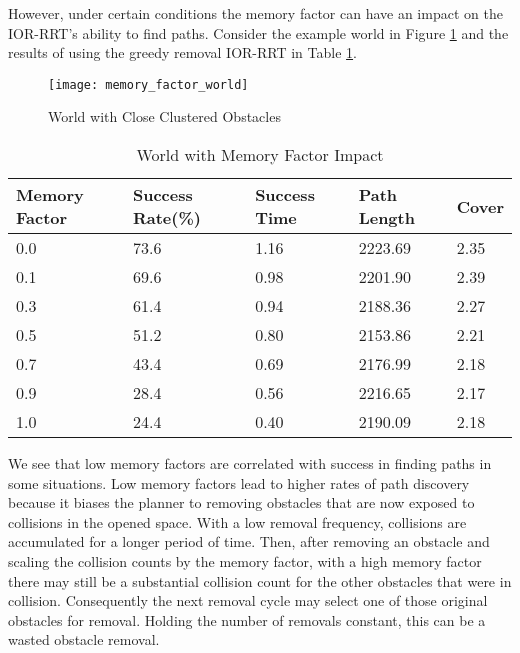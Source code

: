 However, under certain conditions the memory factor can have an impact on the IOR-RRT's ability to find paths. Consider the example world in Figure \ref{fig:memory_factor_world} and the results of using the greedy removal IOR-RRT in Table \ref{tab:memory_factor_impact}.


\begin{figure}[h!]
    \centering
    \texttt{[image: memory\_factor\_world]}
    \caption{World with Close Clustered Obstacles}
    \label{fig:memory_factor_world}
\end{figure}

\begin{table}[h!]
\centering
\begin{tabular}{@{}lllll@{}}
\toprule
Memory Factor & Success Rate(\%)  & Success Time & Path Length & Cover \\ 
\midrule
0.0 & 73.6 & 1.16 & 2223.69 & 2.35 \\
0.1 & 69.6 & 0.98 & 2201.90 & 2.39 \\
0.3 & 61.4 & 0.94 & 2188.36 & 2.27 \\
0.5 & 51.2 & 0.80 & 2153.86 & 2.21 \\
0.7 & 43.4 & 0.69 & 2176.99 & 2.18 \\
0.9 & 28.4 & 0.56 & 2216.65 & 2.17 \\ 
1.0 & 24.4 & 0.40 & 2190.09 & 2.18 \\
\bottomrule
\end{tabular}
\caption{World with Memory Factor Impact}
\label{tab:memory_factor_impact}
\end{table}

We see that low memory factors are correlated with success in finding paths in some situations. Low memory factors lead to higher rates of path discovery because it biases the planner to removing obstacles that are now exposed to collisions in the opened space. With a low removal frequency, collisions are accumulated for a longer period of time. Then, after removing an obstacle and scaling the collision counts by the memory factor, with a high memory factor there may still be a substantial collision count for the other obstacles that were in collision. Consequently the next removal cycle may select one of those original obstacles for removal. Holding the number of removals constant, this can be a wasted obstacle removal. 

